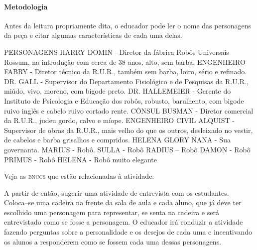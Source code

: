 \documentclass[11pt]{extarticle}
\begin{document}

\paragraph{Metodologia} Antes da leitura propriamente dita, o educador pode ler o nome das personagens da peça e citar algumas características de cada uma delas.

PERSONAGENS 
HARRY DOMIN -  Diretor da fábrica Robôs Universais Rossum, na introdução com cerca de 38 anos, alto, sem barba.
 ENGENHEIRO FABRY -  Diretor técnico da R.U.R., também sem barba, loiro, sério e refinado. 
DR. GALL -  Supervisor do Departamento Fisiológico e de Pesquisas da R.U.R., miúdo, vivo, moreno, com bigode preto.
 DR. HALLEMEIER - Gerente do Instituto de Psicologia e Educação dos robôs, robusto, barulhento, com bigode ruivo inglês e cabelo ruivo cortado rente. 
CÔNSUL BUSMAN -  Diretor comercial da R.U.R., judeu gordo, calvo e míope. 
ENGENHEIRO CIVIL ALQUIST -  Supervisor de obras da R.U.R., mais velho do que os outros, desleixado no vestir, de cabelos e barba grisalhos e compridos. 
HELENA GLORY 
NANA - Sua governanta. 
MARIUS - Robô.
SULLA -  Robô
RADIUS – Robô
DAMON - Robô
PRIMUS - Robô
HELENA - Robô muito elegante

Veja as \textsc{bnccs} que estão relacionadas à atividade:


A partir de então, sugerir uma atividade de entrevista com os estudantes. Coloca–se uma cadeira na frente da sala de aula e cada aluno, que já deve ter escolhido uma personagem para representar, se senta na cadeira e será entrevistado como se fosse a personagem. O educador irá conduzir a atividade fazendo perguntas sobre a personalidade e os desejos de cada uma e incentivando os alunos a responderem como se fossem cada uma dessas personagens.
\end{document}
